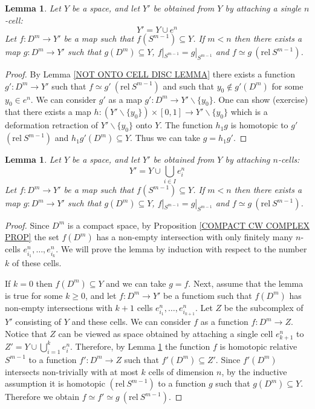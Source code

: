 \documentclass[11pt, letterpaper, oneside]{report}
\theoremstyle{pplain}
\newtheorem{lemma}[theorem]{Lemma}
\theoremstyle{ddefinition}
\theoremstyle{nnn}
\theoremstyle{eexercise}
\newcommand{\ssmin}{\smallsetminus}
\renewcommand{\setminus}{\ssmin}
\newcommand{\rel}{\mathrm{rel\ }}
\begin{document}
\begin{lemma}
\label{CELLULAR ONE CELL DISC LEMMA}
Let $Y$ be a space, and let $Y'$ be obtained from $Y$ by attaching a single $n$-cell:
$$Y' = Y\cup e^{n}$$
Let $f\colon D^{m} \to Y'$ be a map such that $f(S^{m-1}) \subseteq Y$. If $m< n$ then 
there exists a map $g\colon D^{m}\to Y'$ such that $g(D^{m})\subseteq Y$, 
$f|_{S^{m-1}} = g|_{S^{m-1}}$ and $f\simeq g \ (\rel S^{m-1})$.
\end{lemma}

\begin{proof}
By Lemma \ref{NOT ONTO CELL DISC LEMMA} there exists a function $g'\colon D^{m} \to Y'$
such that $f \simeq g' \ (\rel S^{m-1})$ and such that $y_{0}\not\in g'(D^{m})$ for some $y_{0}\in e^{n}$. 
We can consider $g'$ as a map $g'\colon D^{m} \to  Y' \setminus \{y_{0}\}$. One can show (exercise) 
that there exists a map $h\colon (Y' \setminus \{y_{0}\})\times [0, 1] \to Y' \setminus \{y_{0}\}$ which 
is a deformation retraction of $Y' \setminus \{y_{0}\}$ onto $Y$. The function $h_{1}g$ is homotopic to $g'$
$(\rel S^{m-1})$ and $h_{1}g'(D^{m}) \subseteq Y$. Thus we can take $g = h_{1}g'$. 
\end{proof}


\begin{lemma}
\label{CELLULAR N-CELLS DISC LEMMA}
Let $Y$ be a space, and let $Y'$ be obtained from $Y$ by attaching $n$-cells:
$$Y' = Y\cup \bigcup_{i\in I} e^{n}_{i}$$
Let $f\colon D^{m} \to Y'$ be a map such that $f(S^{m-1}) \subseteq Y$. If $m< n$ then 
there exists a map $g\colon D^{m}\to Y'$ such that $g(D^{m})\subseteq Y$, 
$f|_{S^{m-1}} = g|_{S^{m-1}}$ and $f\simeq g \ (\rel S^{m-1})$.
\end{lemma}

\begin{proof}
Since $D^{m}$ is a compact space, by Proposition \ref{COMPACT CW COMPLEX PROP}
the set $f(D^{m})$ has a non-empty intersection with only finitely many $n$-cells
$e^{n}_{i_{1}}, \dots, e^{n}_{i_{k}}$. We will prove the lemma by induction with respect to the number 
$k$ of these cells. 

If $k = 0$ then $f(D^{m}) \subseteq Y$ and we can take $g = f$.  Next, assume that the 
lemma is true for some $k\geq 0$, and let $f\colon D^{m} \to Y'$ be a functiom such that
$f(D^{m})$ has non-empty intersections with $k+1$ cells $e^{n}_{i_{1}}, \dots, e^{n}_{i_{k+1}}$.
Let $Z$ be the subcomplex of $Y'$ consisting of $Y$ and these cells.
We can consider $f$ as a function $f\colon D^{m} \to Z$. Notice that $Z$ can be viewed as space 
obtained by attaching a single cell $e^{n}_{k+1}$ to $Z' = Y \cup \bigcup_{i=1}^{k} e^{n}_{i}$. 
Therefore, by Lemma \ref{CELLULAR ONE CELL DISC LEMMA} the function $f$ is homotopic 
relative $S^{m-1}$ to a function $f'\colon D^{m}\to Z$ such that $f'(D^{m})\subseteq Z'$. Since 
$f'(D^{m})$ intersects non-trivially with at most $k$ cells of dimension $n$, by the inductive assumption 
it is homotopic $(\rel S^{m-1})$ to a function $g$ such that $g(D^{m})\subseteq Y$. Therefore 
we obtain $f\simeq f' \simeq g \ (\rel S^{m-1})$.  
\end{proof}
\end{document}
